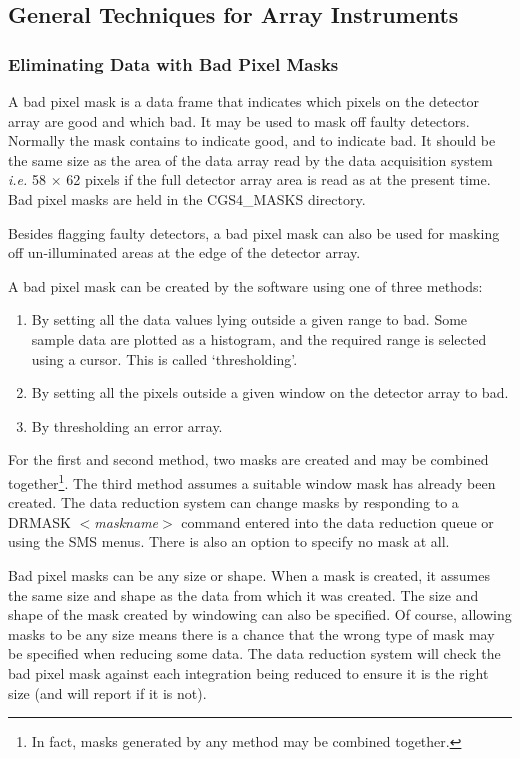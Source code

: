 {\subsection{General Techniques for Array Instruments}
\label{general_techniques_for_array_instruments}

\subsubsection{Eliminating Data with Bad Pixel Masks}
\label{eliminating_data_with_bad_pixel_masks}

A bad pixel mask is a data frame that indicates which pixels on the 
detector array are {\sf good} and which {\sf bad}.
It may be used to mask off faulty detectors.
Normally the mask contains {} to indicate {\sf good}, and {} to 
indicate {\sf bad}. It should be the same size as the area of the data 
array read by the data acquisition system {\em i.e.}
58 $\times$ 62 pixels if the full detector array area is read as at the present
time. Bad pixel masks are held in the {\sf CGS4\_MASKS} directory.

Besides flagging faulty detectors, a bad pixel mask can also be used
for masking off un-illuminated areas at the edge of the detector array.

A bad pixel mask can be created by the software using one of three methods:

\begin{enumerate}
 \item By setting all the data values lying outside a given range to {\sf bad}.
 Some sample data are plotted as a histogram, and the required range is 
 selected using a cursor. This is called `thresholding'.
 \item By setting all the pixels outside a given window on the detector 
 array to bad.
 \item By thresholding an error array.
\end{enumerate}

For the first and second method, two masks are created and may be combined
together\footnote{In fact, masks generated by any method may be combined 
together.}. The third method assumes a suitable window mask has already been
created. The data reduction system can change masks by responding to a 
{\sf DRMASK $<${\em maskname}$>$ } command entered into the data reduction
queue or using the SMS menus. There is also an option to specify no mask at all.

Bad pixel masks can be any size or shape. When a mask is created, it
assumes the same size and shape as the data from which it was created.
The size and shape of the mask created by windowing can also be
specified. Of course, allowing masks to be any size means there is a
chance that the wrong type of mask may be specified when reducing some
data. The data reduction system will check the bad pixel mask against
each integration being reduced to ensure it is the right size (and will
report if it is not).

}
